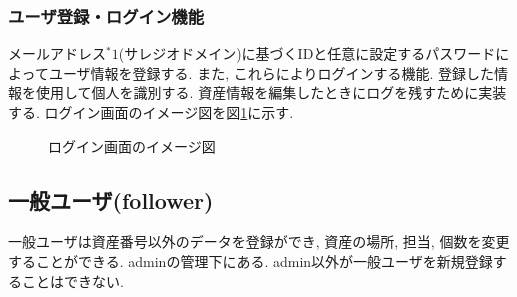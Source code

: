 \documentclass[11ptm]{jsarticle}
\begin{document}
\subsubsection{ユーザ登録・ログイン機能}
\label{subsec:ユーザ登録・ログイン機能}
メールアドレス$^*1$(サレジオドメイン)に基づくIDと任意に設定するパスワードによってユーザ情報を登録する. また, これらによりログインする機能. 登録した情報を使用して個人を識別する. 資産情報を編集したときにログを残すために実装する. ログイン画面のイメージ図を図\ref{fig:ログイン画面のイメージ図}に示す. 
\begin{figure}[h]
  \centering
  \caption{\label{fig:ログイン画面のイメージ図}ログイン画面のイメージ図}
\end{figure}

\clearpage
\subsection{一般ユーザ(follower)}
\label{subsec:一般ユーザ(follower)}
一般ユーザは資産番号以外のデータを登録ができ, 資産の場所, 担当, 個数を変更することができる. adminの管理下にある. admin以外が一般ユーザを新規登録することはできない.

\end{document}
